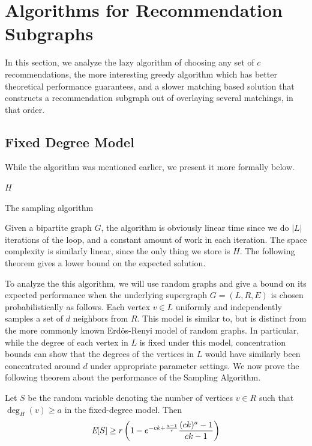 \section{Algorithms for Recommendation Subgraphs}
In this section, we analyze the lazy algorithm of choosing any set of
$c$ recommendations, the more interesting greedy algorithm which has
better theoretical performance guarantees, and a slower matching based
solution that constructs a recommendation subgraph out of overlaying
several matchings, in that order.

\subsection{Fixed Degree Model}
\label{fixed-degree}

While the algorithm was mentioned earlier, we present it more formally 
below.

\begin{algorithm}[H]
  \SetAlgoLined
  \Return $H$\;
  \caption{The sampling algorithm}
\end{algorithm}\vs

Given a bipartite graph $G$, the algorithm is obviously linear time
since we do $|L|$ iterations of the loop, and a constant amount of
work in each iteration. The space complexity is similarly linear,
since the only thing we store is $H$. The following theorem gives a
lower bound on the expected solution.

To analyze the this algorithm, we will use random graphs and give a
bound on its expected performance when the underlying supergraph $G=(L,R,E)$
is chosen probabilistically as follows. Each vertex $v\in L$
uniformly and independently samples a set of $d$ neighbors from $R$.
This model is similar to, but is distinct from the more commonly 
known Erd\"{o}s-Renyi model of random graphs. In particular, while the
degree of each vertex in $L$ is fixed under this model, concentration
bounds can show that the degrees of the vertices in $L$ would have
similarly been concentrated around $d$ under appropriate parameter
settings. We now prove the following theorem about the performance
of the Sampling Algorithm.

\begin{thm}\label{original_result}
Let $S$ be the
random variable denoting the number of vertices $v \in R$ such that
$\deg_{H}(v)\geq a$ in the fixed-degree model. Then
\[ \emph{\text{E}}[S] \geq r\left(1-e^{-ck+\frac{a-1}{r}}\frac{(ck)^a-1}{ck-1}\right)  \]
\end{thm}

